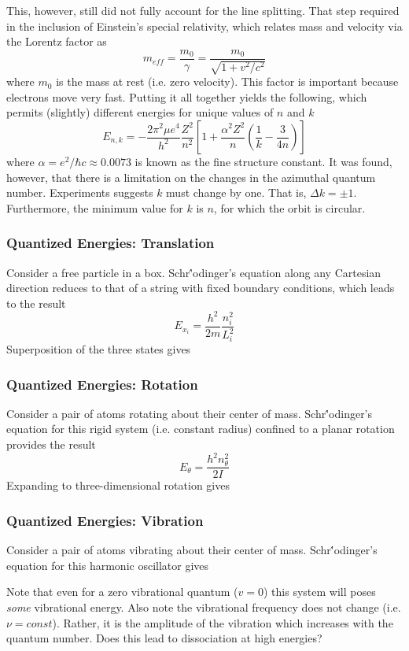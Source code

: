 \documentclass[11pt]{article}
\newcommand{\CenteredBoxed}[1]{\begin{center}\boxed{#1}\end{center}}
\begin{document}
This, however, still did not fully account for the line splitting. That step required in the inclusion of Einstein's special relativity, which relates mass and velocity via the Lorentz factor as
$$m_{eff} = \frac{m_0}{\gamma} = \frac{m_0}{\sqrt{1+v^2/c^2}}$$
where $m_0$ is the mass at rest (i.e. zero velocity). This factor is important because electrons move very fast. Putting it all together yields the following, which permits (slightly) different energies for unique values of $n$ and $k$
$$E_{n,k} = -\frac{2\pi^2\mu e^4}{h^2}\frac{Z^2}{n^2}\left[1+\frac{\alpha^2Z^2}{n}\left(\frac{1}{k}-\frac{3}{4n}\right)\right]$$
where $\alpha = e^2/\hbar c\approx 0.0073$ is known as the fine structure constant. It was found, however, that there is a limitation on the changes in the azimuthal quantum number. Experiments suggests $k$ must change by one. That is, $\Delta k = \pm1$. Furthermore, the minimum value for $k$ is $n$, for which the orbit is circular.

\subsubsection{Quantized Energies: Translation}
Consider a free particle in a box. Schr{\''o}dinger's equation along any Cartesian direction reduces to that of a string with fixed boundary conditions, which leads to the result
$$E_{x_i} = \frac{h^2}{2m}\frac{n_i^2}{L_i^2}$$
Superposition of the three states gives
\CenteredBoxed{E_{trans} = \frac{h^2}{8m}\sum\frac{n_i^2}{L_i^2}}

\subsubsection{Quantized Energies: Rotation}
Consider a pair of atoms rotating about their center of mass. Schr{\''o}dinger's equation for this rigid system (i.e. constant radius) confined to a planar rotation provides the result
$$E_{\theta} = \frac{h^2n_{\theta}^2}{2I}$$
Expanding to three-dimensional rotation gives
\CenteredBoxed{E_{rot} = J(J+1)\frac{\hbar}{2I}}

\subsubsection{Quantized Energies: Vibration}
Consider a pair of atoms vibrating about their center of mass. Schr{\''o}dinger's equation for this harmonic oscillator gives
\CenteredBoxed{E_{vib} = h\nu\left(v+\frac{1}{2}\right)}

Note that even for a zero vibrational quantum ($v=0$) this system will poses \emph{some} vibrational energy. Also note the vibrational frequency does not change (i.e. $\nu = const$). Rather, it is the amplitude of the vibration which increases with the quantum number. Does this lead to dissociation at high energies?
\end{document}
